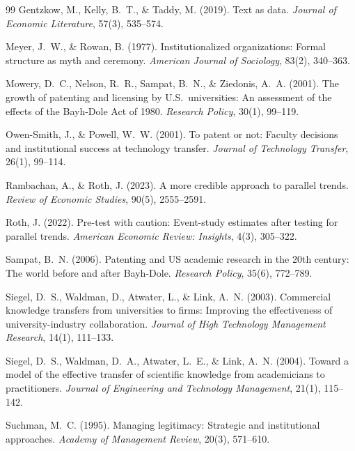\documentclass[12pt]{article}
\begin{document}
\begin{thebibliography}{99}
Gentzkow, M., Kelly, B.~T., \& Taddy, M. (2019). Text as data. \textit{Journal of
Economic Literature}, 57(3), 535--574.

Meyer, J.~W., \& Rowan, B. (1977). Institutionalized organizations: Formal structure
as myth and ceremony. \textit{American Journal of Sociology}, 83(2), 340--363.

Mowery, D.~C., Nelson, R.~R., Sampat, B.~N., \& Ziedonis, A.~A. (2001).
The growth of patenting and licensing by U.S.\ universities: An assessment of the
effects of the Bayh-Dole Act of 1980. \textit{Research Policy}, 30(1), 99--119.

Owen-Smith, J., \& Powell, W.~W. (2001). To patent or not: Faculty decisions and
institutional success at technology transfer. \textit{Journal of Technology Transfer},
26(1), 99--114.

Rambachan, A., \& Roth, J. (2023). A more credible approach to parallel trends.
\textit{Review of Economic Studies}, 90(5), 2555--2591.

Roth, J. (2022). Pre-test with caution: Event-study estimates after testing for parallel
trends. \textit{American Economic Review: Insights}, 4(3), 305--322.

Sampat, B.~N. (2006). Patenting and US academic research in the 20th century: The world
before and after Bayh-Dole. \textit{Research Policy}, 35(6), 772--789.

Siegel, D.~S., Waldman, D., Atwater, L., \& Link, A.~N. (2003). Commercial knowledge
transfers from universities to firms: Improving the effectiveness of university-industry
collaboration. \textit{Journal of High Technology Management Research}, 14(1), 111--133.

Siegel, D.~S., Waldman, D.~A., Atwater, L.~E., \& Link, A.~N. (2004). Toward a model
of the effective transfer of scientific knowledge from academicians to practitioners.
\textit{Journal of Engineering and Technology Management}, 21(1), 115--142.

Suchman, M.~C. (1995). Managing legitimacy: Strategic and institutional approaches.
\textit{Academy of Management Review}, 20(3), 571--610.


\end{thebibliography}
\end{document}
